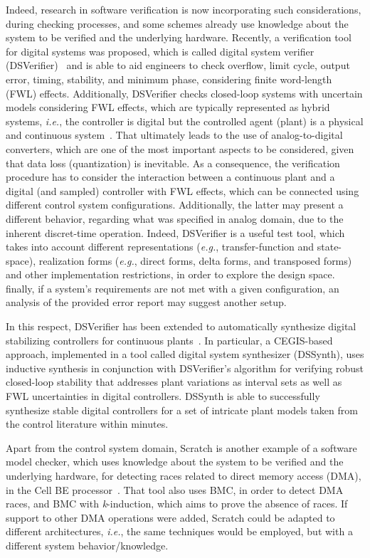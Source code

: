 \documentclass{acm_sen_article}
\begin{document}
Indeed, research in software verification is now incorporating such considerations, during checking processes, and some schemes already use knowledge about the system to be verified and the underlying hardware. Recently, a verification tool for digital systems was proposed, which is called digital system verifier (DSVerifier)~\cite{dsv_spin2015,Monteiro16} and is able to aid engineers to check overflow, limit cycle, output error, timing, stability, and minimum phase, considering finite word-length (FWL) effects. Additionally, DSVerifier checks closed-loop systems with uncertain models considering FWL effects, which are typically represented as hybrid systems, {\it i.e.}, the controller is digital but the controlled agent (plant) is a physical and continuous system~\cite{Bessa17}. That ultimately leads to the use of analog-to-digital converters, which are one of the most important aspects to be considered, given that data loss (quantization) is inevitable. As a consequence, the verification procedure has to consider the interaction between a continuous plant and a digital (and sampled) controller with FWL effects, which can be connected using different control system configurations. Additionally, the latter may present a different behavior, regarding what was specified in analog domain, due to the inherent discret-time operation. Indeed, DSVerifier is a useful test tool, which takes into account different representations ({\it e.g.}, transfer-function and state-space), realization forms ({\it e.g.}, direct forms, delta forms, and transposed forms) and other implementation restrictions, in order to explore the design space. finally, if a system's requirements are not met with a given configuration, an analysis of the provided error report may suggest another setup. 

In this respect, DSVerifier has been extended to automatically synthesize digital stabilizing controllers for continuous plants~\cite{Abate17}. In particular, a CEGIS-based approach, implemented in a tool called digital system synthesizer (DSSynth), uses inductive synthesis in conjunction with DSVerifier's algorithm for verifying robust closed-loop stability that addresses plant variations as interval sets as well as FWL uncertainties in digital controllers. DSSynth is able to successfully synthesize stable digital controllers for a set of intricate plant models taken from the control literature within minutes.

Apart from the control system domain, Scratch is another example of a software model checker, which uses knowledge about the system to be verified and the underlying hardware, for detecting races related to direct memory access (DMA), in the Cell BE processor~\cite{Donaldson10}. That tool also uses BMC, in order to detect DMA races, and BMC with \textit{k}-induction, which aims to prove the absence of races. If support to other DMA operations were added, Scratch could be adapted to different architectures, {\it i.e.}, the same techniques would be employed, but with a different system behavior/knowledge.
\end{document}
